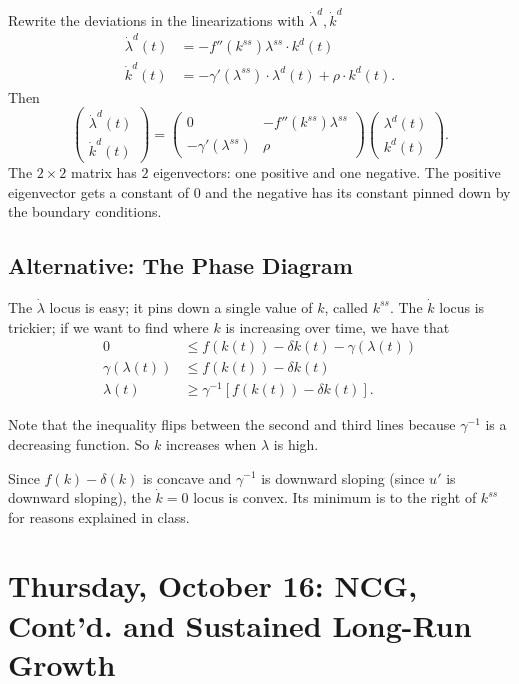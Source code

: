 \documentclass{tufte-handout}
\theoremstyle{definition}
\begin{document}
Rewrite the deviations in the linearizations with $\dot{\lambda}^d, \dot{k}^d$
\begin{align*}
	\dot{\lambda}^d(t) &= -f''(k^{ss})\lambda^{ss} \cdot k^d(t) \\
	\dot{k}^d(t) &= -\gamma'(\lambda^{ss}) \cdot \lambda^d(t) + \rho \cdot k^d(t)
.\end{align*}
Then 
\[
	\begin{pmatrix}
	\dot{\lambda}^d(t)  \\
	\dot{k}^d(t)
	\end{pmatrix} = \begin{pmatrix}
	0 & -f''(k^{ss})\lambda^{ss} \\
	-\gamma'(\lambda^{ss}) & \rho
	\end{pmatrix} \begin{pmatrix}
	\lambda^d(t) \\
	k^d(t)
	\end{pmatrix} 
.\] 
The $2 \times 2$ matrix has $2$ eigenvectors: one positive and one negative. The positive eigenvector gets a constant of $0$ and the negative has its constant pinned down by the boundary conditions.

\subsection{Alternative: The Phase Diagram}
The $\dot{\lambda}$ locus is easy; it pins down a single value of $k$, called $k^{ss}$. The $\dot{k}$ locus is trickier; if we want to find where $k$ is increasing over time, we have that 
\begin{align*}
	0 &\le f(k(t)) - \delta k(t) - \gamma(\lambda(t)) \\
	\gamma(\lambda(t)) &\le f(k(t)) - \delta k(t) \\
		   \lambda(t) &\ge \gamma^{-1} \left[ f(k(t)) - \delta k(t) \right] 
.\end{align*}

Note that the inequality flips between the second and third lines because $\gamma^{-1}$ is a decreasing function. So $k$ increases when $\lambda$ is high.

Since $f(k)-\delta(k)$ is concave and $\gamma^{-1}$ is downward sloping (since $u'$ is downward sloping), the $\dot{k} = 0$ locus is convex. Its minimum is to the right of $k^{ss}$ for reasons explained in class.


\section{Thursday, October 16: NCG, Cont'd. and Sustained Long-Run Growth}
\end{document}
